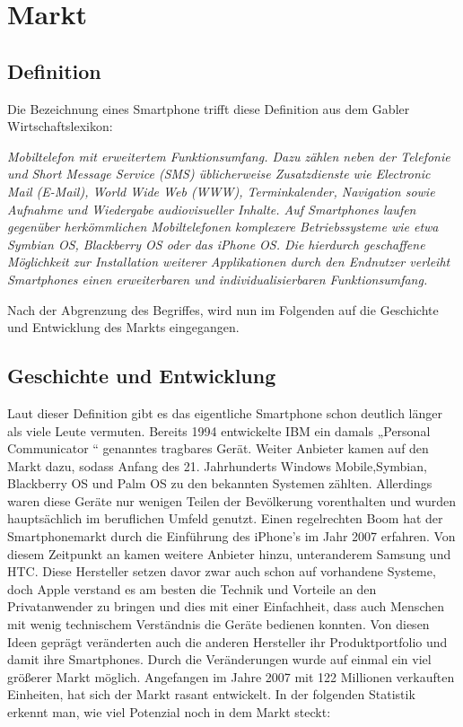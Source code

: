 
\chapter{Markt}

\section{Definition}

Die Bezeichnung eines Smartphone trifft diese Definition aus dem Gabler Wirtschaftslexikon:

\textit{Mobiltelefon mit erweitertem Funktionsumfang. Dazu zählen neben der Telefonie und Short Message Service (SMS) üblicherweise Zusatzdienste wie Electronic Mail (E-Mail), World Wide Web (WWW), Terminkalender, Navigation sowie Aufnahme und Wiedergabe audiovisueller Inhalte. Auf Smartphones laufen gegenüber herkömmlichen Mobiltelefonen komplexere Betriebssysteme wie etwa Symbian OS, Blackberry OS oder das iPhone OS. Die hierdurch geschaffene Möglichkeit zur Installation weiterer Applikationen durch den Endnutzer verleiht Smartphones einen erweiterbaren und individualisierbaren Funktionsumfang.}

Nach der Abgrenzung des Begriffes, wird nun im Folgenden auf die Geschichte und Entwicklung des Markts eingegangen.


\section{Geschichte und Entwicklung}

Laut dieser Definition gibt es das eigentliche Smartphone schon deutlich länger als viele Leute vermuten. Bereits 1994 entwickelte IBM ein damals „Personal Communicator “ genanntes tragbares Gerät. Weiter Anbieter kamen auf den Markt dazu, sodass Anfang des 21. Jahrhunderts Windows Mobile,Symbian, Blackberry OS und Palm OS zu den bekannten Systemen zählten. Allerdings waren diese Geräte nur wenigen Teilen der Bevölkerung vorenthalten  und wurden hauptsächlich im beruflichen Umfeld genutzt. Einen regelrechten Boom hat der Smartphonemarkt durch die Einführung des iPhone’s im Jahr 2007 erfahren. Von diesem Zeitpunkt an kamen weitere Anbieter hinzu, unteranderem Samsung und HTC. Diese Hersteller setzen davor zwar auch schon auf vorhandene Systeme, doch Apple verstand es am besten die Technik und Vorteile an den Privatanwender zu bringen und dies mit einer Einfachheit, dass auch Menschen mit wenig technischem Verständnis die Geräte bedienen konnten. Von diesen Ideen geprägt veränderten auch die anderen Hersteller ihr Produktportfolio und damit ihre Smartphones. Durch die Veränderungen wurde auf einmal ein viel größerer Markt möglich. Angefangen im Jahre 2007 mit 122 Millionen verkauften Einheiten, hat sich der Markt rasant entwickelt. In der folgenden Statistik erkennt man, wie viel Potenzial noch in dem Markt steckt: 

